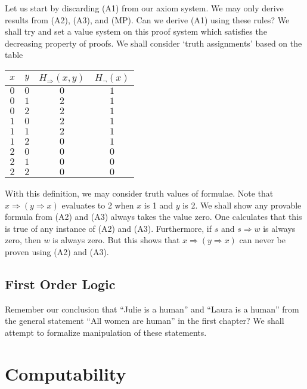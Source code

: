 Let us start by discarding (A1) from our axiom system. We may only derive results from (A2), (A3), and (MP). Can we derive (A1) using these rules? We shall try and set a value system on this proof system which satisfies the decreasing property of proofs. We shall consider `truth assignments' based on the table
%
\begin{center}
    \begin{tabular}{| c | c | c | c | }
        \hline $x$ & $y$ & $H_\Rightarrow(x,y)$ & $H_\neg(x)$ \\
        \hline $0$ & $0$ & $0$ & $1$ \\
        $0$ & $1$ & $2$ & $1$ \\
        $0$ & $2$ & $2$ & $1$ \\
        $1$ & $0$ & $2$ & $1$ \\
        $1$ & $1$ & $2$ & $1$ \\
        $1$ & $2$ & $0$ & $1$ \\
        $2$ & $0$ & $0$ & $0$ \\
        $2$ & $1$ & $0$ & $0$ \\
        $2$ & $2$ & $0$ & $0$ \\
        \hline
    \end{tabular}
\end{center}
%
With this definition, we may consider truth values of formulae. Note that $x \Rightarrow (y \Rightarrow x)$ evaluates to 2 when $x$ is 1 and $y$ is 2. We shall show any provable formula from (A2) and (A3) always takes the value zero. One calculates that this is true of any instance of (A2) and (A3). Furthermore, if $s$ and $s \Rightarrow w$ is always zero, then $w$ is always zero. But this shows that $x \Rightarrow (y \Rightarrow x)$ can never be proven using (A2) and (A3).







\chapter{First Order Logic}

Remember our conclusion that ``Julie is a human'' and ``Laura is a human'' from the general statement ``All women are human'' in the first chapter? We shall attempt to formalize manipulation of these statements.






\part{Computability}

